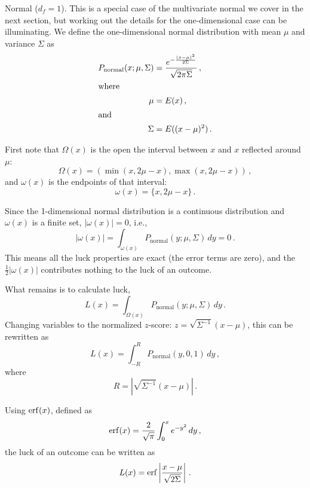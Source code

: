 \begin{example}{Normal ($d_f=1$).}
This is a special case of the multivariate normal we cover in the next section, but working out the details for the one-dimensional case can be illuminating.  We define the one-dimensional normal distribution with mean $\mu$ and variance $\Sigma$ as
\begin{align}
P_{\text{normal}}(x;\mu,\Sigma) &= \frac{e^{-\frac{(x-\mu)^2}{2\Sigma}}}{\sqrt{2\pi\Sigma}} \,,\\
\intertext{where}
\mu &= E(x)\,,\\
\intertext{and}
\Sigma &= E((x-\mu)^2) \,.
\end{align}

First note that $\Omega(x)$ is the open the interval between $x$ and $x$ reflected around $\mu$:
\begin{equation}
\Omega(x)=(\min(x,2\mu-x),\max(x,2\mu-x)) \,,
\end{equation}
and $\omega(x)$ is the endpoints of that interval:
\begin{equation}
\omega(x)=\{x,2\mu-x\} \,.
\end{equation}

Since the 1-dimensional normal distribution is a continuous distribution and $\omega(x)$ is a finite set, $|\omega(x)|=0$, i.e.,
\begin{equation}
|\omega(x)|=\int_{\omega(x)} P_{\text{normal}}(y;\mu,\Sigma) \, dy = 0 \,.
\end{equation}
This means all the luck properties are exact (the error terms are zero), and the $\frac{1}{2}|\omega(x)|$ contributes nothing to the luck of an outcome.

What remains is to calculate luck,
\begin{equation}
L(x)=\int_{\Omega(x)} P_{\text{normal}}(y;\mu,\Sigma) \, dy \,.
\end{equation}
Changing variables to the normalized $z$-score: $z=\sqrt{\Sigma^{-1}}(x-\mu)$, this can be rewritten as
\begin{equation}
L(x)=\int_{-R}^{R} P_{\text{normal}}(y,0,1) \, dy \,,
\end{equation}
where
\begin{equation}
R=|\sqrt{\Sigma^{-1}}(x-\mu)| \,.
\end{equation}

Using $\operatorname{erf}(x)$, defined as
\begin{equation}
\operatorname{erf}(x) = \frac{2}{\sqrt{\pi}} \int_0^x e^{-y^2} \, dy \,, 
\end{equation}
the luck of an outcome can be written as
\begin{equation}
\label{eq:normal-1d-luck}
L(x)=\operatorname{erf}\left|\frac{x-\mu}{\sqrt{2\Sigma}} \right| \,.
\end{equation}


\end{example}
